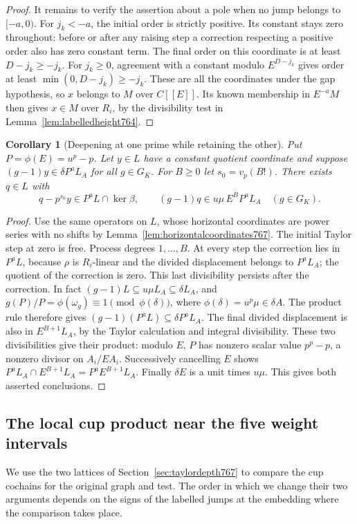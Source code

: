 \documentclass[a4paper,11pt]{article}
\newtheorem{corollary}[proposition]{Corollary}
\theoremstyle{definition}
\theoremstyle{remark}
\numberwithin{equation}{section}
\begin{document}
\begin{proof}
It remains to verify the assertion about a pole when no
jump belongs to \([-a,0)\). For \(j_k<-a\), the initial
order is strictly positive. Its constant stays zero
throughout: before or after any raising step a correction
respecting a positive order also has zero constant term.
The final order on this coordinate is at least
\(D-j_k\ge-j_k\). For \(j_k\ge0\), agreement with a
constant modulo \(E^{D-j_k}\) gives order at least
\(\min(0,D-j_k)\ge-j_k\). These are all the coordinates
under the gap hypothesis, so \(x\) belongs to \(M\)
over \(C[[E]]\). Its known membership in \(E^{-a}M\)
then gives \(x\in M\) over \(R_i\), by the divisibility
test in Lemma~\ref{lem:labelledheight764}.
\end{proof}

\begin{corollary}[Deepening at one prime while retaining the other]
\leavevmode\label{cor:secondlatticedepth767}
Put \(P=\phi(E)=u^p-p\). Let \(y\in L\) have a constant
quotient coordinate and suppose
\((g-1)y\in\delta P^a L_A\) for all \(g\in G_K\).
For \(B\ge0\) let \(s_0=v_p(B!)\). There exists \(q\in L\)
with
\[
   q-p^{s_0}y\in P^a L\cap\ker\beta,\qquad
   (g-1)q\in u\mu\, E^B P^a L_A\quad(g\in G_K).
\]
\end{corollary}
\begin{proof}
Use the same operators on \(L\), whose horizontal coordinates
are power series with no shifts by Lemma~\ref{lem:horizontalcoordinates767}.
The initial Taylor step at zero is free. Process degrees
\(1,\ldots,B\). At every step the correction lies in
\(P^a L\), because \(\rho\) is \(R_i\)-linear and the
divided displacement belongs to \(P^a L_A\); the quotient
of the correction is zero. This last divisibility persists
after the correction. In fact \((g-1)L\subseteq u\mu L_A
\subseteq\delta L_A\), and
\(g(P)/P=\phi(\omega_g)\equiv1\pmod{\phi(\delta)}\),
where \(\phi(\delta)=u^p\mu\in\delta A\). The product
rule therefore gives \((g-1)(P^a L)\subseteq\delta P^a L_A\).
The final divided displacement is also in \(E^{B+1}L_A\),
by the Taylor calculation and integral divisibility.
These two divisibilities give their product: modulo \(E\),
\(P\) has nonzero scalar value \(p^p-p\), a nonzero
divisor on \(A_i/EA_i\). Successively cancelling \(E\)
shows \(P^aL_A\cap E^{B+1}L_A=P^aE^{B+1}L_A\).
Finally \(\delta E\) is a unit times \(u\mu\).
This gives both asserted conclusions.
\end{proof}
\clearpage

\subsection{The local cup product near the five weight intervals}
\label{sec:localweightmultiples768}
We use the two lattices of Section~\ref{sec:taylordepth767}
to compare the cup cochains for the original graph and
test. The order in which we change their two arguments
depends on the signs of the labelled jumps at the embedding
where the comparison takes place.
\end{document}
